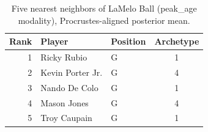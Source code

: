 \begin{table}[htbp]
  \centering\small
  \begin{tabular}{rllc}
    \toprule
    Rank & Player & Position & Archetype \\
    \midrule
    1 & Ricky Rubio & G & 1 \\
    2 & Kevin Porter Jr. & G & 4 \\
    3 & Nando De Colo & G & 1 \\
    4 & Mason Jones & G & 4 \\
    5 & Troy Caupain & G & 1 \\
    \bottomrule
  \end{tabular}
  \caption{Five nearest neighbors of LaMelo Ball (peak_age modality), Procrustes-aligned posterior mean.}
  \label{tab:LaMelo_Ball_neighbors_peak_age}
\end{table}

